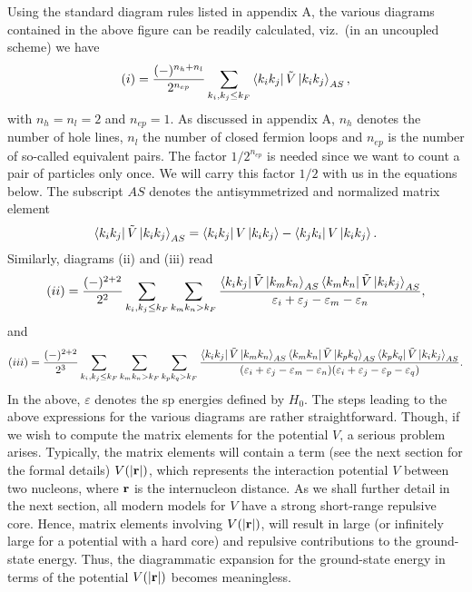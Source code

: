 Using the standard diagram rules listed  in appendix A, the various
diagrams contained in the above figure can be readily calculated, viz.\
(in an uncoupled scheme) we
have
\begin{equation}
   (i)=\frac{(-)^{n_h+n_l}}{2^{n_{ep}}}\sum_{k_i,k_j\leq k_F}
       \left\langle k_ik_j \right|\tilde{V}\left| k_ik_j \right\rangle_{AS},
\end{equation}
with $n_h=n_l=2$ and $n_{ep}=1$. As discussed  in appendix A, $n_h$
denotes the number of hole lines, $n_l$ the number of closed
fermion loops and $n_{ep}$ is the number of so-called
equivalent pairs.
The factor $1/2^{n_{ep}}$ is needed since we want to count a pair 
of particles only once. We will carry this factor $1/2$ with us
in the equations below. 
The subscript
$AS$ denotes the antisymmetrized and normalized matrix element
\begin{equation}
     \left\langle k_ik_j \right|\tilde{V}\left| k_ik_j \right\rangle_{AS}=\left\langle k_ik_j \right|V\left| k_ik_j \right\rangle-
     \left\langle k_jk_i \right|V\left| k_ik_j \right\rangle.
\end{equation}
Similarly, diagrams (ii) and (iii) read
\begin{equation}
   (ii)=\frac{(-)^{2+2}}{2^2}\sum_{k_i,k_j\leq k_F}\sum_{k_mk_n>k_F}
   \frac{\left\langle k_ik_j \right|\tilde{V}\left| k_mk_n \right\rangle_{AS}
   \left\langle k_mk_n \right|\tilde{V}\left| k_ik_j \right\rangle_{AS}}
   {\varepsilon_i+\varepsilon_j-\varepsilon_m-\varepsilon_n},
\end{equation}
and
\begin{equation}
   (iii)=\frac{(-)^{2+2}}{2^3}\sum_{k_i,k_j\leq k_F}\sum_{k_mk_n>k_F}
   \sum_{k_pk_q>k_F}
   \frac{\left\langle k_ik_j \right|\tilde{V}\left| k_mk_n \right\rangle_{AS}
   \left\langle k_mk_n \right|\tilde{V}\left| k_pk_q \right\rangle_{AS}
   \left\langle k_pk_q \right|\tilde{V}\left| k_ik_j \right\rangle_{AS}}
   {(\varepsilon_i+\varepsilon_j-\varepsilon_m-\varepsilon_n)
   (\varepsilon_i+\varepsilon_j-\varepsilon_p-\varepsilon_q)}.
\end{equation}
In the above, $\varepsilon$ denotes the sp energies defined by
$H_0$.
The steps leading to the above expressions for the various
diagrams are rather straightforward. Though, if we wish to compute the
matrix elements for the potential $V$, a serious problem
arises. Typically, the matrix elements will contain a term
(see the next section for the formal details) $V(|{\bf r}|)$, which
represents the interaction potential $V$ between two nucleons, where
${\bf r}$ is the internucleon distance.
As we shall further detail in the next section, all modern models
for $V$ have a strong short-range repulsive core. Hence,
matrix elements involving $V(|{\bf r}|)$, will result in large
(or infinitely large for a potential with a hard core)
and repulsive contributions to the ground-state energy. Thus, the
diagrammatic expansion for the ground-state energy in terms of the
potential $V(|{\bf r}|)$ becomes meaningless.

